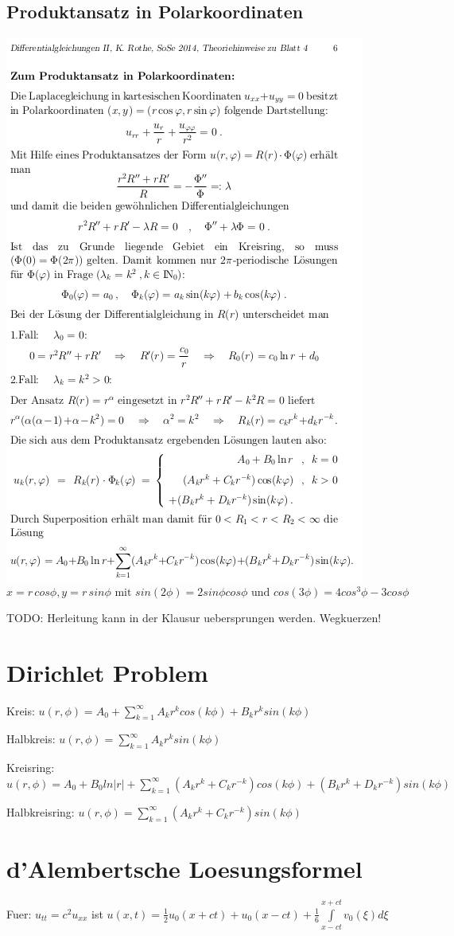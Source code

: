 \documentclass[10pt,a4paper]{article}
\begin{document}
\subsection{Produktansatz in Polarkoordinaten}
\includegraphics[scale=0.6]{ununderstandable}
\[
x = r\,cos\phi, y=r\,sin\phi \mbox{ mit } sin(2\phi)=2sin\phi cos\phi \mbox{ und } cos(3\phi)=4cos^3\phi - 3cos \phi
\]

TODO: Herleitung kann in der Klausur uebersprungen werden. Wegkuerzen!

\section{Dirichlet Problem}
Kreis: $u(r, \phi) = A_0 + \sum\limits_{k=1}^\infty A_k r^k cos(k \phi) + B_k r^k sin(k \phi)$

Halbkreis: $u(r, \phi) = \sum\limits_{k=1}^\infty A_k r^k sin(k \phi)$

Kreisring: $u(r, \phi) = A_0 + B_0 ln|r| + \sum\limits_{k=1}^\infty \left(A_k r^k + C_k r^{-k} \right) cos(k \phi) + \left(B_k r^k + D_k r^{-k} \right) sin(k \phi)$

Halbkreisring: $u(r, \phi) = \sum\limits_{k=1}^\infty \left(A_k r^k + C_k r^{-k} \right) sin(k \phi)$

\section{d'Alembertsche Loesungsformel}
Fuer: $u_{tt} = c^2 u_{xx}$ ist $u(x,t) = \frac{1}{2}u_0(x+ct) + u_0(x-ct) + \frac{1}{6}\int\limits_{x-ct}^{x+ct} v_0\left(\xi\right) d \xi $
\end{document}
